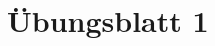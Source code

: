 \documentclass[paper=a4, fontsize=11pt]{scrartcl}
\begin{document}
\section*{Übungsblatt 1}
\end{document}
